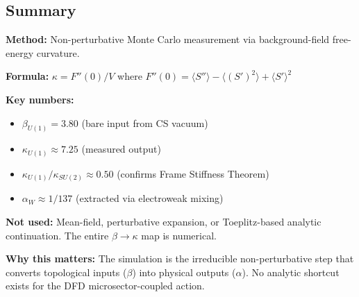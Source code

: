 \subsection{Summary}

\begin{tcolorbox}[colback=blue!5!white, colframe=blue!50!black,
  title=The $\beta \to \kappa$ Map in DFD]

\textbf{Method:} Non-perturbative Monte Carlo measurement via
background-field free-energy curvature.

\textbf{Formula:}
$\kappa = F''(0)/V$ where $F''(0) = \langle S'' \rangle
- \langle (S')^2 \rangle + \langle S' \rangle^2$

\textbf{Key numbers:}
\begin{itemize}[nosep]
\item $\beta_{U(1)} = 3.80$ (bare input from CS vacuum)
\item $\kappa_{U(1)} \approx 7.25$ (measured output)
\item $\kappa_{U(1)}/\kappa_{SU(2)} \approx 0.50$ (confirms Frame Stiffness Theorem)
\item $\alpha_W \approx 1/137$ (extracted via electroweak mixing)
\end{itemize}

\textbf{Not used:} Mean-field, perturbative expansion, or Toeplitz-based
analytic continuation. The entire $\beta \to \kappa$ map is numerical.

\textbf{Why this matters:} The simulation is the irreducible non-perturbative
step that converts topological inputs ($\beta$) into physical outputs ($\alpha$).
No analytic shortcut exists for the DFD microsector-coupled action.
\end{tcolorbox}



